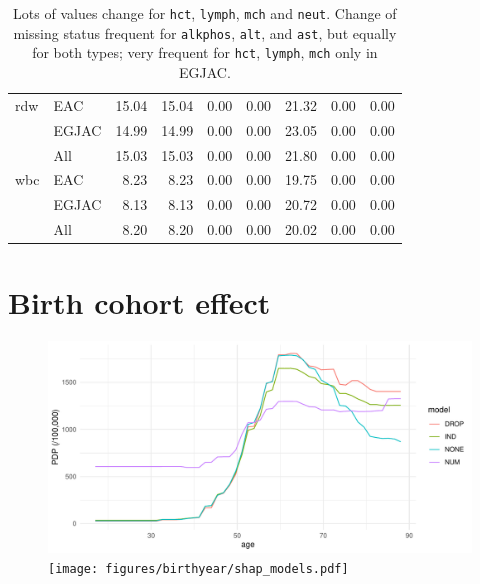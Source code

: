 \documentclass[12pt]{article}
\begin{document}
\begin{table}[ht]
\begin{tabular}{llrrrrrrr}
  rdw & EAC & 15.04 & 15.04 & 0.00 & 0.00 & 21.32 & 0.00 & 0.00 \\ 
   & EGJAC & 14.99 & 14.99 & 0.00 & 0.00 & 23.05 & 0.00 & 0.00 \\ 
   & All & 15.03 & 15.03 & 0.00 & 0.00 & 21.80 & 0.00 & 0.00 \\  \addlinespace
  wbc & EAC & 8.23 & 8.23 & 0.00 & 0.00 & 19.75 & 0.00 & 0.00 \\ 
   & EGJAC & 8.13 & 8.13 & 0.00 & 0.00 & 20.72 & 0.00 & 0.00 \\ 
   & All & 8.20 & 8.20 & 0.00 & 0.00 & 20.02 & 0.00 & 0.00 \\ 
   \bottomrule
\end{tabular}
\caption{Lots of values change for \texttt{hct}, \texttt{lymph}, \texttt{mch} and \texttt{neut}. 
Change of missing status frequent for \texttt{alkphos}, \texttt{alt}, and \texttt{ast}, but equally for both types;
very frequent for \texttt{hct}, \texttt{lymph}, \texttt{mch} only in EGJAC.}
\end{table}



\clearpage
\section*{Birth cohort effect}



\begin{figure}[h]
\centering
\includegraphics[width=\textwidth]{figures/birthyear/pdp_models.pdf}
\texttt{[image: figures/birthyear/shap\_models.pdf]}
\end{figure}
\end{document}
